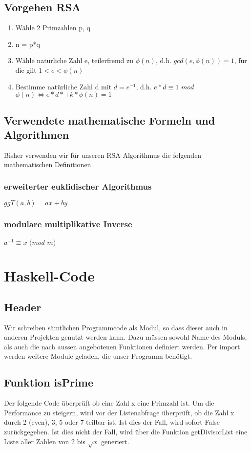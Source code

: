 \documentclass[a4paper, 11pt]{article} %
\begin{document}
\subsection{Vorgehen RSA}
\begin{enumerate}
\item Wähle 2 Primzahlen p, q
\item n = p*q
\item Wähle natürliche Zahl e, teilerfremd zu $\phi (n)$, d.h. $gcd(e,\phi(n)) = 1$, für die gilt $1 < e < \phi(n)$
\item Bestimme natürliche Zahl d mit $d=e^{-1}$, d.h. $e*d \equiv 1$ $mod$ $\phi (n) \Longleftrightarrow e*d*+k*\phi (n) = 1$
\end{enumerate}

\subsection{Verwendete mathematische Formeln und Algorithmen}
Bisher verwenden wir für unseren RSA Algorithmus die folgenden mathematischen Definitionen. 
\subsubsection{erweiterter euklidischer Algorithmus}
$ggT(a,b)= ax+by$
\subsubsection{modulare multiplikative Inverse}
$a^{-1}\equiv x $ $(mod$ $ m)$


\section{Haskell-Code}
\subsection{Header}
Wir schreiben sämtlichen Programmcode als Modul, so dass dieser auch in anderen Projekten genutzt werden kann. Dazu müssen sowohl Name des Moduls, als auch die nach aussen angebotenen Funktionen definiert werden. Per import werden weitere Module geladen, die unser Programm benötigt.


\subsection{Funktion isPrime}
Der folgende Code überprüft ob eine Zahl x eine Primzahl ist. Um die Performance zu steigern, wird vor der Listenabfrage überprüft, ob die Zahl x durch 2 (even), 3, 5 oder 7 teilbar ist. Ist dies der Fall, wird sofort False zurückgegeben.
Ist dies nicht der Fall, wird über die Funktion getDivisorList eine Liste aller Zahlen von 2 bis $\sqrt{x}$ generiert.
\end{document}

